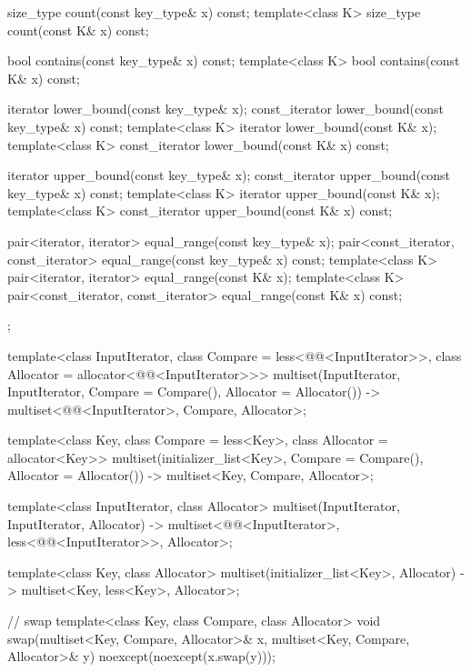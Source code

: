\begin{codeblock}
{{    size_type      count(const key_type& x) const;
    template<class K> size_type count(const K& x) const;

    bool           contains(const key_type& x) const;
    template<class K> bool contains(const K& x) const;

    iterator       lower_bound(const key_type& x);
    const_iterator lower_bound(const key_type& x) const;
    template<class K> iterator       lower_bound(const K& x);
    template<class K> const_iterator lower_bound(const K& x) const;

    iterator       upper_bound(const key_type& x);
    const_iterator upper_bound(const key_type& x) const;
    template<class K> iterator       upper_bound(const K& x);
    template<class K> const_iterator upper_bound(const K& x) const;

    pair<iterator, iterator>               equal_range(const key_type& x);
    pair<const_iterator, const_iterator>   equal_range(const key_type& x) const;
    template<class K>
      pair<iterator, iterator>             equal_range(const K& x);
    template<class K>
      pair<const_iterator, const_iterator> equal_range(const K& x) const;
  };

  template<class InputIterator,
           class Compare = less<@@<InputIterator>>,
           class Allocator = allocator<@@<InputIterator>>>
    multiset(InputIterator, InputIterator,
             Compare = Compare(), Allocator = Allocator())
      -> multiset<@@<InputIterator>, Compare, Allocator>;

  template<class Key, class Compare = less<Key>, class Allocator = allocator<Key>>
    multiset(initializer_list<Key>, Compare = Compare(), Allocator = Allocator())
      -> multiset<Key, Compare, Allocator>;

  template<class InputIterator, class Allocator>
    multiset(InputIterator, InputIterator, Allocator)
      -> multiset<@@<InputIterator>,
                  less<@@<InputIterator>>, Allocator>;

  template<class Key, class Allocator>
    multiset(initializer_list<Key>, Allocator) -> multiset<Key, less<Key>, Allocator>;

  // swap
  template<class Key, class Compare, class Allocator>
    void swap(multiset<Key, Compare, Allocator>& x,
              multiset<Key, Compare, Allocator>& y)
      noexcept(noexcept(x.swap(y)));
}
\end{codeblock}%
%

